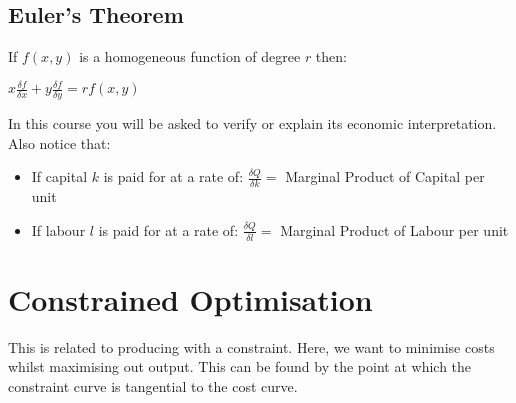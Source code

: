 \documentclass[12pt, letterpaper]{article}
\begin{document}
\subsection{Euler's Theorem}
If $f(x,y)$ is a homogeneous function of degree $r$ then:
\begin{center}
	\Large{$x\frac{\delta f}{\delta x} + y \frac{\delta f}{\delta y} = rf(x, y)$}\\
\end{center}
In this course you will be asked to verify or explain its economic interpretation. Also notice that:
\begin{itemize}
	\item If capital $k$ is paid for at a rate of: $\frac{\delta Q}{\delta k}=$ Marginal Product of Capital per unit
	\item If labour $l$ is paid for at a rate of: $\frac{\delta Q}{\delta l} =$ Marginal Product of Labour per unit
\end{itemize}

\newpage
\section{Constrained Optimisation}
This is related to producing with a constraint. Here, we want to minimise costs whilst maximising out output. This can be found by the point at which the constraint curve is tangential to the cost curve.
\end{document}
